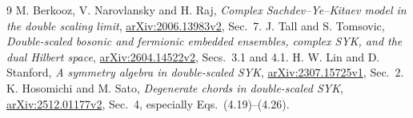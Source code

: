 \documentclass[11pt,a4paper]{article}
\begin{document}
\begin{thebibliography}{9}
 M. Berkooz, V. Narovlansky and H. Raj,
\emph{Complex Sachdev--Ye--Kitaev model in the double scaling limit},
\href{https://arxiv.org/html/2006.13983v2}{arXiv:2006.13983v2}, Sec.~7.
 J. Tall and S. Tomsovic,
\emph{Double-scaled bosonic and fermionic embedded ensembles,
complex SYK, and the dual Hilbert space},
\href{https://arxiv.org/html/2604.14522v2}{arXiv:2604.14522v2},
Secs.~3.1 and 4.1.
 H. W. Lin and D. Stanford,
\emph{A symmetry algebra in double-scaled SYK},
\href{https://arxiv.org/html/2307.15725v1}{arXiv:2307.15725v1}, Sec.~2.
 K. Hosomichi and M. Sato,
\emph{Degenerate chords in double-scaled SYK},
\href{https://arxiv.org/html/2512.01177v2}{arXiv:2512.01177v2},
Sec.~4, especially Eqs.~(4.19)--(4.26).
\end{thebibliography}
\end{document}
